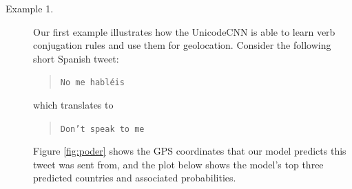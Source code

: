 \documentclass[sigconf,anonymous,review,10pt]{acmart}
\newcommand{\str}[1]{\texttt{#1}}
\begin{document}

\begin{description}
\item[Example 1.]
    Our first example illustrates how the UnicodeCNN is able to learn verb conjugation rules and use them for geolocation.
    Consider the following short Spanish tweet:%
    \begin{quote}
        \str{No me habl\'eis}
    \end{quote}
    which translates to
    \begin{quote}
        \str{Don't speak to me}
    \end{quote}
Figure \ref{fig:poder} shows the GPS coordinates that our model predicts this tweet was sent from,
and the plot below shows the model's top three predicted countries and associated probabilities.

\noindent


\begin{figure}


\end{figure}
\end{description}
\end{document}
